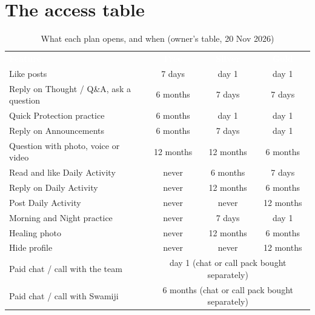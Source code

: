 \documentclass[11pt,a4paper,oneside]{report}
\newcommand{\thead}[1]{\textcolor{white}{\bfseries #1}}
\newcommand{\headrow}{\rowcolor{ojDeep}}
\begin{document}
\section{The access table}
\newcommand{\cellF}[1]{\cellcolor{ojTealL}#1}
\newcommand{\cellN}{\cellcolor{ojRose}\textcolor{ojOrange}{never}}
\begin{table}[H]
\centering
\small
\begin{tabular}{@{}lccc@{}}
\headrow \thead{Feature} & \thead{Free} & \thead{Silver} & \thead{Gold} \\
Like posts & 7 days & \cellF{day 1} & \cellF{day 1} \\
Reply on Thought / Q\&A, ask a question & 6 months & 7 days & 7 days \\
Quick Protection practice & 6 months & \cellF{day 1} & \cellF{day 1} \\
Reply on Announcements & 6 months & 7 days & \cellF{day 1} \\
Question with photo, voice or video & 12 months & 12 months & 6 months \\
Read and like Daily Activity & \cellN & 6 months & 7 days \\
Reply on Daily Activity & \cellN & 12 months & 6 months \\
Post Daily Activity & \cellN & \cellN & 12 months \\
Morning and Night practice & \cellN & 7 days & \cellF{day 1} \\
Healing photo & \cellN & 12 months & 6 months \\
Hide profile & \cellN & \cellN & 12 months \\
\rowcolor{ojLav} Paid chat / call with the team & \multicolumn{3}{c}{day 1 (chat or call pack bought separately)} \\
\rowcolor{ojLav} Paid chat / call with Swamiji & \multicolumn{3}{c}{6 months (chat or call pack bought separately)} \\
\bottomrule
\end{tabular}
\caption{What each plan opens, and when (owner's table, 20 Nov 2026)}
\label{tab:access}
\end{table}
\end{document}
